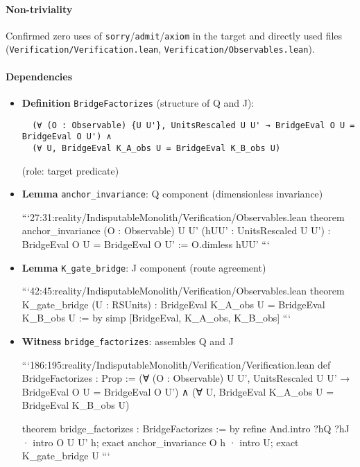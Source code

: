 \documentclass{article}
\begin{document}
\paragraph{Non-triviality}
Confirmed zero uses of \texttt{sorry}/\texttt{admit}/\texttt{axiom} in the target and directly used files (\texttt{Verification/Verification.lean}, \texttt{Verification/Observables.lean}).

\paragraph{Dependencies}
\begin{itemize}[leftmargin=*]
  \item \textbf{Definition} \texttt{BridgeFactorizes} (structure of Q and J):
  \begin{lstlisting}
  (∀ (O : Observable) {U U'}, UnitsRescaled U U' → BridgeEval O U = BridgeEval O U') ∧
  (∀ U, BridgeEval K_A_obs U = BridgeEval K_B_obs U)
  \end{lstlisting}
  (role: target predicate)
  
  \item \textbf{Lemma} \texttt{anchor\_invariance}: Q component (dimensionless invariance)
  
```27:31:reality/IndisputableMonolith/Verification/Observables.lean
theorem anchor_invariance (O : Observable) {U U'}
  (hUU' : UnitsRescaled U U') : BridgeEval O U = BridgeEval O U' :=
  O.dimless hUU'
```

  \item \textbf{Lemma} \texttt{K\_gate\_bridge}: J component (route agreement)

```42:45:reality/IndisputableMonolith/Verification/Observables.lean
theorem K_gate_bridge (U : RSUnits) : BridgeEval K_A_obs U = BridgeEval K_B_obs U := by
  simp [BridgeEval, K_A_obs, K_B_obs]
```

  \item \textbf{Witness} \texttt{bridge\_factorizes}: assembles Q and J

```186:195:reality/IndisputableMonolith/Verification/Verification.lean
def BridgeFactorizes : Prop :=
  (∀ (O : Observable) {U U'}, UnitsRescaled U U' → BridgeEval O U = BridgeEval O U')
  ∧ (∀ U, BridgeEval K_A_obs U = BridgeEval K_B_obs U)

theorem bridge_factorizes : BridgeFactorizes := by
  refine And.intro ?hQ ?hJ
  · intro O U U' h; exact anchor_invariance O h
  · intro U; exact K_gate_bridge U
```
\end{itemize}
\end{document}
